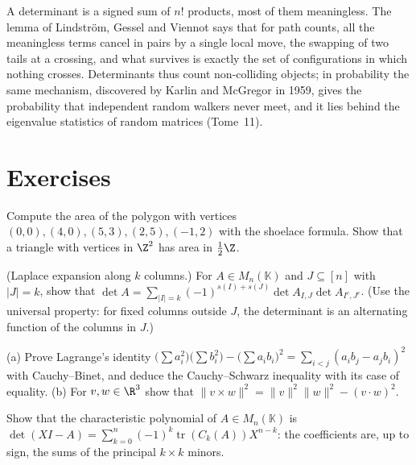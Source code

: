 \begin{beauty}
A determinant is a signed sum of $n!$ products, most of them meaningless. The lemma of Lindstr\"om, Gessel and Viennot
says that for path counts, all the meaningless terms cancel in pairs by a single local move, the swapping of two tails at
a crossing, and what survives is exactly the set of configurations in which nothing crosses. Determinants thus count
non-colliding objects; in probability the same mechanism, discovered by Karlin and McGregor in 1959, gives the
probability that independent random walkers never meet, and it lies behind the eigenvalue statistics of random
matrices (Tome~11).
\end{beauty}

\section{Exercises}

\begin{exercise}[$\star$]\label{ex:latticetriangle}
Compute the area of the polygon with vertices $(0,0),(4,0),(5,3),(2,5),(-1,2)$ with the shoelace formula. Show that a
triangle with vertices in $\Z^2$ has area in $\frac12\Z$.
\end{exercise}

\begin{exercise}[$\star$]\label{ex:laplace}
(Laplace expansion along $k$ columns.) For $A\in M_n(\mathbb K)$ and $J\subseteq[n]$ with $|J|=k$, show that
$\det A=\sum_{|I|=k}(-1)^{s(I)+s(J)}\det A_{I,J}\det A_{I^c,J^c}$. (Use the universal property: for fixed columns outside $J$,
the determinant is an alternating function of the columns in $J$.)
\end{exercise}

\begin{exercise}[$\star\star$]\label{ex:lagrangeid}
(a) Prove Lagrange's identity $\bigl(\sum a_i^2\bigr)\bigl(\sum b_i^2\bigr)-\bigl(\sum a_ib_i\bigr)^2=\sum_{i<j}(a_ib_j-a_jb_i)^2$
with Cauchy--Binet, and deduce the Cauchy--Schwarz inequality with its case of equality. (b) For $v,w\in\R^3$ show that
$\|v\times w\|^2=\|v\|^2\|w\|^2-(v\cdot w)^2$.
\end{exercise}

\begin{exercise}[$\star\star$]\label{ex:charpoly}
Show that the characteristic polynomial of $A\in M_n(\mathbb K)$ is $\det(XI-A)=\sum_{k=0}^n(-1)^k\operatorname{tr}(C_k(A))X^{n-k}$:
the coefficients are, up to sign, the sums of the principal $k\times k$ minors.
\end{exercise}

